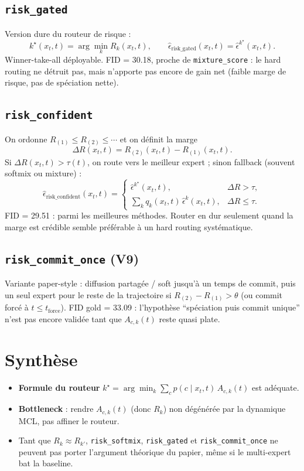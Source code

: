 \documentclass[11pt,a4paper]{article}
\newcommand{\epshat}{\hat{\epsilon}}
\newcommand{\Rk}{R_k}
\begin{document}
\subsection{\texttt{risk\_gated}}

Version dure du routeur de risque :
\[
k^\star(x_t,t) = \arg\min_{k} \Rk(x_t,t),
\qquad
\epshat_{\mathrm{risk\_gated}}(x_t,t) = \epshat^{k^\star}(x_t,t).
\]
Winner-take-all déployable.
FID = 30.18, proche de \texttt{mixture\_score} : le hard routing ne détruit pas,
mais n'apporte pas encore de gain net (faible marge de risque, pas de spéciation nette).

\subsection{\texttt{risk\_confident}}

On ordonne $R_{(1)} \le R_{(2)} \le \cdots$ et on définit la marge
\[
\Delta R(x_t,t) = R_{(2)}(x_t,t) - R_{(1)}(x_t,t).
\]
Si $\Delta R(x_t,t) > \tau(t)$, on route vers le meilleur expert ;
sinon fallback (souvent softmix ou mixture) :
\[
\epshat_{\mathrm{risk\_confident}}(x_t,t)
=
\begin{cases}
\epshat^{k^\star}(x_t,t), & \Delta R > \tau,\\[4pt]
\sum_k q_k(x_t,t)\,\epshat^k(x_t,t), & \Delta R \le \tau.
\end{cases}
\]
FID = 29.51 : parmi les meilleures méthodes.
Router en dur seulement quand la marge est crédible semble préférable à un hard routing systématique.

\subsection{\texttt{risk\_commit\_once} (V9)}

Variante paper-style : diffusion partagée / soft jusqu'à un temps de commit,
puis un seul expert pour le reste de la trajectoire si
$R_{(2)} - R_{(1)} > \theta$ (ou commit forcé à $t \le t_{\mathrm{force}}$).
FID gold = 33.09 : l'hypothèse ``spéciation puis commit unique'' n'est pas encore validée
tant que $A_{c,k}(t)$ reste quasi plate.

\section{Synthèse}

\begin{itemize}
  \item \textbf{Formule du routeur} $k^\star = \arg\min_k \sum_c p(c\mid x_t,t)\, A_{c,k}(t)$ est adéquate.
  \item \textbf{Bottleneck} : rendre $A_{c,k}(t)$ (donc $\Rk$) non dégénérée par la dynamique MCL, pas affiner le routeur.
  \item Tant que $\Rk \approx R_{k'}$, \texttt{risk\_softmix}, \texttt{risk\_gated} et \texttt{risk\_commit\_once}
  ne peuvent pas porter l'argument théorique du papier, même si le multi-expert bat la baseline.
\end{itemize}
\end{document}
